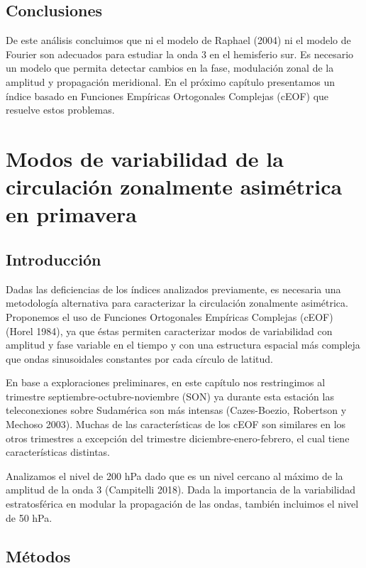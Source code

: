 \documentclass[12pt,oneside,a4paper]{reedthesis}
\begin{document}
\hypertarget{conclusiones}{%
\section{Conclusiones}\label{conclusiones}}

De este análisis concluimos que ni el modelo de Raphael (2004) ni el modelo de Fourier son adecuados para estudiar la onda 3 en el hemisferio sur.
Es necesario un modelo que permita detectar cambios en la fase, modulación zonal de la amplitud y propagación meridional.
En el próximo capítulo presentamos un índice basado en Funciones Empíricas Ortogonales Complejas (cEOF) que resuelve estos problemas.

\hypertarget{ceofs}{%
\chapter{Modos de variabilidad de la circulación zonalmente asimétrica en primavera}\label{ceofs}}

\hypertarget{introducciuxf3n}{%
\section{Introducción}\label{introducciuxf3n}}

Dadas las deficiencias de los índices analizados previamente, es necesaria una metodología alternativa para caracterizar la circulación zonalmente asimétrica.
Proponemos el uso de Funciones Ortogonales Empíricas Complejas (cEOF) (Horel 1984), ya que éstas permiten caracterizar modos de variabilidad con amplitud y fase variable en el tiempo y con una estructura espacial más compleja que ondas sinusoidales constantes por cada círculo de latitud.

En base a exploraciones preliminares, en este capítulo nos restringimos al trimestre septiembre-octubre-noviembre (SON) ya durante esta estación las teleconexiones sobre Sudamérica son más intensas (Cazes-Boezio, Robertson y Mechoso 2003).
Muchas de las características de los cEOF son similares en los otros trimestres a excepción del trimestre diciembre-enero-febrero, el cual tiene características distintas.

Analizamos el nivel de 200 hPa dado que es un nivel cercano al máximo de la amplitud de la onda 3 (Campitelli 2018).
Dada la importancia de la variabilidad estratosférica en modular la propagación de las ondas, también incluimos el nivel de 50 hPa.

\hypertarget{muxe9todos-1}{%
\section{Métodos}\label{muxe9todos-1}}
\end{document}
